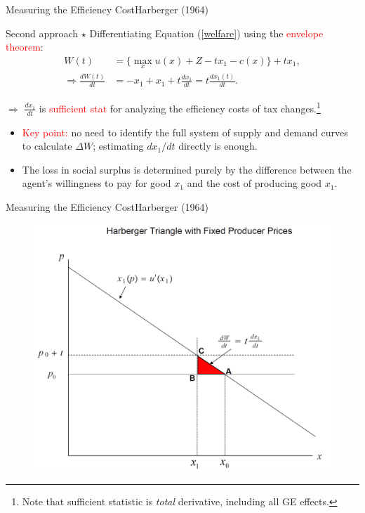 \documentclass{beamer}
\begin{document}
\begin{frame}{Measuring the Efficiency Cost}{Harberger (1964)}
	\begin{block}{Second approach $\star$}
		Differentiating Equation (\ref{welfare}) using the \textcolor{red}{envelope theorem}:
		\begin{equation}\label{welfare change}
			\begin{aligned}
				W(t) &= \{\max_x u(x) + Z - tx_1 - c(x)\} + tx_1,\\
				\Rightarrow \frac{dW(t)}{dt} &= -x_1 + x_1 + t\frac{dx_1}{dt} = t\frac{dx_1(t)}{dt}.
			\end{aligned}
		\end{equation}

		$\Rightarrow$ $\frac{dx_1}{dt}$ is \textcolor{red}{sufficient stat} for analyzing the efficiency costs of tax changes.\footnote{Note that sufficient statistic is \textit{total} derivative, including all GE effects.}
		\begin{itemize}
			\item \textcolor{red}{Key point:} no need to identify the full system of supply and demand curves to calculate $\Delta W$; estimating $dx_1/dt$ directly is enough.
			\item The loss in social surplus is determined purely by the difference between the agent’s willingness to pay for good $x_1$ and the cost of producing good $x_1$.
		\end{itemize}
	\end{block}
\end{frame}
\begin{frame}[label=triangle]{Measuring the Efficiency Cost}{Harberger (1964)}
	\begin{figure}[h]
		\centering
		\includegraphics[scale=0.42]{harberger_tri.png}
	\end{figure}	
\end{frame}
\end{document}
